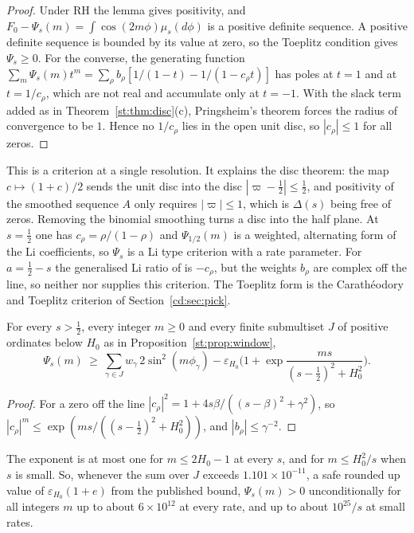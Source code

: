 \begin{proof}
Under RH the lemma gives positivity, and $F_0-\Psi_s(m)=\int\cos(2m\phi)\mu_s(d\phi)$ is a positive definite sequence. A positive definite sequence is bounded by its value at zero, so the Toeplitz condition gives $\Psi_s\ge0$. For the converse, the generating function $\sum_m\Psi_s(m)t^m=\sum_\rho b_\rho[1/(1-t)-1/(1-c_\rho t)]$ has poles at $t=1$ and at $t=1/c_\rho$, which are not real and accumulate only at $t=-1$. With the slack term added as in Theorem~\ref{st:thm:disc}(c), Pringsheim's theorem forces the radius of convergence to be $1$. Hence no $1/c_\rho$ lies in the open unit disc, so $|c_\rho|\le1$ for all zeros.
\end{proof}
This is a criterion at a single resolution. It explains the disc theorem: the map $c\mapsto(1+c)/2$ sends the unit disc into the disc $|\varpi-\tfrac12|\le\tfrac12$, and positivity of the smoothed sequence $A$ only requires $|\varpi|\le1$, which is $\Delta(s)$ being free of zeros. Removing the binomial smoothing turns a disc into the half plane. At $s=\tfrac12$ one has $c_\rho=\rho/(1-\rho)$ and $\Psi_{1/2}(m)$ is a weighted, alternating form of the Li coefficients, so $\Psi_s$ is a Li type criterion with a rate parameter. For $a=\tfrac12-s$ the generalised Li ratio of \cite{Sekatskii14} is $-c_\rho$, but the weights $b_\rho$ are complex off the line, so neither \cite{BL99} nor \cite{Sekatskii14} supplies this criterion. The Toeplitz form is the Carath\'eodory and Toeplitz criterion of Section~\ref{cd:sec:pick}.
\begin{proposition}\label{st:prop:lirange}
For every $s>\tfrac12$, every integer $m\ge0$ and every finite submultiset $J$ of positive ordinates below $H_0$ as in Proposition~\ref{st:prop:window},
\[
\Psi_s(m)\ \ge\ \sum_{\gamma\in J}w_\gamma\,2\sin^2(m\phi_\gamma)-\varepsilon_{H_0}\Big(1+\exp\frac{ms}{(s-\frac12)^2+H_0^2}\Big).
\]
\end{proposition}
\begin{proof}
For a zero off the line $|c_\rho|^2=1+4s\beta/((s-\beta)^2+\gamma^2)$, so $|c_\rho|^m\le\exp(ms/((s-\tfrac12)^2+H_0^2))$, and $|b_\rho|\le\gamma^{-2}$.
\end{proof}
The exponent is at most one for $m\le2H_0-1$ at every $s$, and for $m\le H_0^2/s$ when $s$ is small. So, whenever the sum over $J$ exceeds $1.101\times10^{-11}$, a safe rounded up value of $\varepsilon_{H_0}(1+e)$ from the published bound, $\Psi_s(m)>0$ unconditionally for all integers $m$ up to about $6\times10^{12}$ at every rate, and up to about $10^{25}/s$ at small rates.

